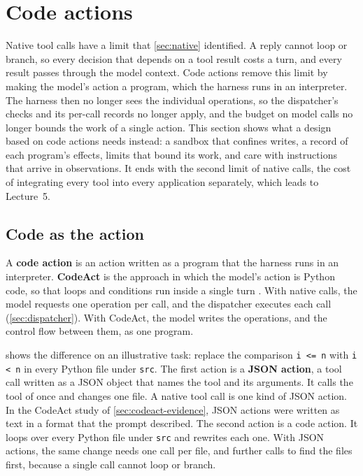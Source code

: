 \section{Code actions}
\label{sec:codeact}

Native tool calls have a limit that \cref{sec:native} identified. A reply cannot loop or branch, so
every decision that depends on a tool result costs a turn, and every result passes through
the model context. Code actions remove this limit by making the model's action a program, which
the harness runs in an interpreter. The harness then no longer sees the individual operations, so
the dispatcher's checks and its per-call records no longer apply, and the budget on model calls no
longer bounds the work of a single action. This section shows what a design based on code actions
needs instead: a sandbox that confines writes, a record of each program's effects, limits that bound
its work, and care with instructions that arrive in observations. It ends with the second limit of
native calls, the cost of integrating every tool into every application separately, which leads to
Lecture~5.

\subsection{Code as the action}
\label{sec:codeact-action}

A \textbf{code action} is an action written as a program that the harness runs in an interpreter.
\textbf{CodeAct} is the approach in which the model's action is Python code, so that loops and
conditions run inside a single turn \citep{wang2024codeact}. With native calls, the model requests
one operation per call, and the dispatcher executes each call (\cref{sec:dispatcher}). With
CodeAct, the model writes the operations, and the control flow between them, as one program.

 shows the difference on an illustrative task: replace the comparison
\texttt{i <= n} with \texttt{i < n} in every Python file under \texttt{src}. The first action is a
\textbf{JSON action}, a tool call written as a JSON object that names the tool and its arguments.
It calls the  tool of \msa{} once and changes one file. A native tool call is one kind
of JSON action. In the CodeAct study of \cref{sec:codeact-evidence}, JSON actions were written as
text in a format that the prompt described. The second action is a code action.
It loops over every Python file under \texttt{src} and rewrites each one. With JSON actions, the
same change needs one call per file, and further calls to find the files first, because a single
call cannot loop or branch.

